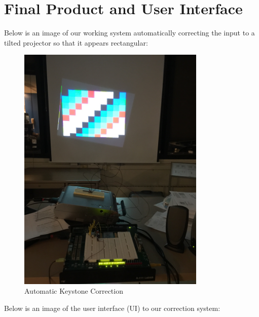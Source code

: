 \documentclass{article}
\begin{document}
\section{Final Product and User Interface}
Below is an image of our working system automatically correcting the input to a tilted projector so that it appears rectangular:
\begin{center}
\begin{figure}[H]
\label{fig:working_correction}
\caption{Automatic Keystone Correction}
\centering
\includegraphics[width=0.8\textwidth]{./img/full-system}
\end{figure}
\end{center}
Below is an image of the user interface (UI) to our correction system:
\end{document}

